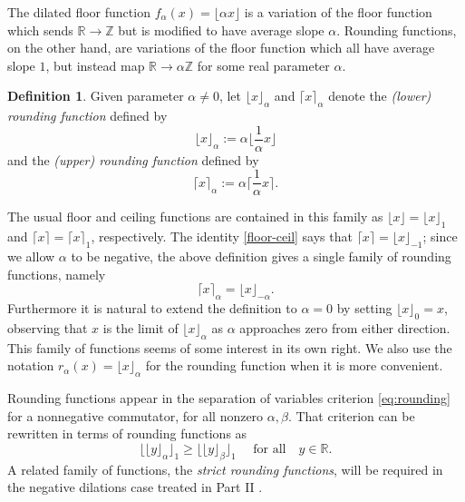\documentclass[11pt, letterpaper, reqno]{amsart}
\theoremstyle{definition}
\newtheorem{defi}[thm]{Definition}
\numberwithin{equation}{section}
\newcommand{\RR}{\ensuremath{\mathbb{R}}}
\newcommand{\ZZ}{\ensuremath{\mathbb{Z}}}
\newcommand{\floor}[1]{\lfloor{#1}\rfloor}
\newcommand{\ceil}[1]{\lceil{#1}\rceil}
\begin{document}
The dilated floor function $f_\alpha(x) = \floor{\alpha x}$ is a variation of the floor
function  which sends $\RR \to \ZZ$ but is modified to have average slope $\alpha$.
Rounding functions, on the other hand, are variations of the floor function which all have average slope $1$, but instead map $\RR \to \alpha \ZZ$ for some real parameter $\alpha$.

\begin{defi}
Given parameter $\alpha \neq 0$, 
let $\floor{x}_\alpha$ and $\ceil{x}_\alpha$ 
denote the {\em (lower) rounding function}  
defined by
\begin{equation*} 
\floor{x}_\alpha := \alpha \floor{\frac{1}{\alpha} x}
\end{equation*}
and the {\em (upper)
rounding function}  defined by
\begin{equation*} 
\ceil{x}_\alpha := \alpha \ceil{\frac1{\alpha} x}. 
\end{equation*}
\end{defi}


The usual floor and ceiling functions are 
contained in this family as $\floor{x} = \floor{x}_1$ and $\ceil{x} = \ceil{x}_1$, respectively.
The identity \eqref{floor-ceil} says that
$\ceil{x} = \floor{x}_{-1}$; 
since we allow  $\alpha$ to be negative, the above definition gives a single family of rounding functions, namely
\begin{equation}\label{eqn:floor-ceil}
\ceil{x}_{\alpha} = \floor{x}_{-\alpha}.
\end{equation}
Furthermore it is natural to extend the definition to $\alpha=0$ by setting $\floor{x}_0 = x$, 
observing that $x$
 is the  limit of $\floor{x}_{\alpha}$ as $\alpha $ approaches zero from either direction.
This family of functions seems of some interest in its own right. 
We also use the notation $r_\alpha(x) = \floor{x}_\alpha$ for the rounding function when it is more convenient.


Rounding functions appear in the separation of variables criterion \eqref{eq:rounding}
for a nonnegative commutator, for all nonzero $\alpha, \beta$.  
That criterion  can be rewritten in terms of  rounding functions as
\begin{equation}\label{eqn:rounding2}
\floor{ \floor{y}_\alpha}_1 \ge \floor{\floor{y}_\beta}_1  \quad \mbox{ for all} \quad y \in \RR.
\end{equation}
A related family of functions, the {\em strict rounding functions},
will be required  in the negative dilations case treated in Part II \cite{LagR:2018b}.
\end{document}
